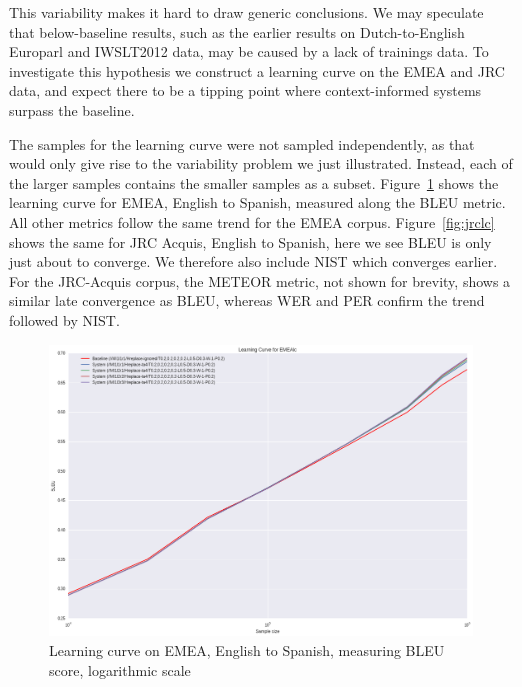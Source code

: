 \documentclass[smallextended]{svjour3}       %
\theoremstyle{break}
\begin{document}
This variability makes it hard to draw generic conclusions.  We may speculate
that below-baseline results, such as the earlier results on Dutch-to-English
Europarl and IWSLT2012 data, may be caused by a lack of trainings data. To
investigate this hypothesis we construct a learning curve on the EMEA and JRC
data, and expect there to be a tipping point where context-informed systems
surpass the baseline.

The samples for the learning curve were not sampled independently, as that
would only give rise to the variability problem we just illustrated.  Instead,
each of the larger samples contains the smaller samples as a subset.
Figure~\ref{fig:emealc} shows the learning curve for EMEA, English to Spanish,
measured along the BLEU metric. All other metrics follow the same trend for the
EMEA corpus.  Figure~\ref{fig:jrclc} shows the same for JRC Acquis, English to
Spanish, here we see BLEU is only just about to converge. We therefore also include
NIST which converges earlier. For the JRC-Acquis corpus, the METEOR metric, not shown for
brevity, shows a similar late convergence as BLEU, whereas WER and PER confirm
the trend followed by NIST.

\begin{figure}
\includegraphics[width=120.00mm]{emealcbleu.png}
\caption{Learning curve on EMEA, English to Spanish, measuring BLEU score, logarithmic scale}
\label{fig:emealc}
\end{figure}
\end{document}
